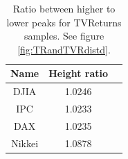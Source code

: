 \documentclass{elsarticle}
\begin{document}
\begin{table}[h!tb]
	\begin{center}
		\setlength\tabcolsep{3pt}
		{\renewcommand{\arraystretch}{1.2}
		\begin{tabular}{|c|c|c|}
			\hline
			Name& Height ratio\\
			\hline
			\hline
			DJIA & 1.0246\\
			\hline
			IPC &1.0233\\
			\hline
			DAX &1.0235\\
			\hline
			Nikkei& 1.0878\\
			\hline
			\hline
		\end{tabular}
		}
	\caption[]{\small Ratio between higher to lower peaks for TVReturns samples. See figure \ref{fig:TRandTVRdistd}.}
	\label{tab:heights}
	\end{center}
\end{table}
\end{document}
